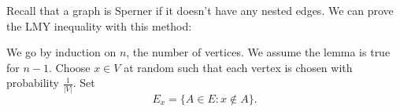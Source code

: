 
Recall that a graph is Sperner if it doesn't have any nested edges. We can prove the LMY inequality with this method:

\begin{replacementproof}
	We go by induction on \( n \), the number of vertices. We assume the lemma is true for \( n-1 \). Choose \( x \in V \) at random such that each vertex is chosen with probability \( \frac{1}{|V|} \). Set \[
		E_x = \{A \in E : x \not\in A\}  
	.\] 
\end{replacementproof}
